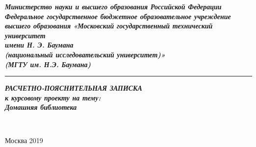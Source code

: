 
\begin{center}
	\hfill \break
	\textit{
		\normalsize {\bf  Министерство науки и высшего образования Российской Федерации}\\
		\normalsize {\bf Федеральное государственное бюджетное образовательное учреждение }\\
		\normalsize {\bf  высшего  образования}
		\normalsize  {\bf  «Московский государственный технический университет}\\ 
		\normalsize  {\bf имени Н. Э. Баумана}\\
		\normalsize  {\bf (национальный исследовательский университет)»}\\
		\normalsize  {\bf (МГТУ им. Н.Э. Баумана)}\\
	}
	\noindent\rule{\textwidth}{2pt}
	\hfill \break
	\hfill\break
	\hfill\break
	\hfill\break
	\hfill\break
	\hfill\break
	\hfill\break
	\hfill \break
	\hfill \break
	\textit{
		\normalsize {\bf РАСЧЕТНО-ПОЯСНИТЕЛЬНАЯ ЗАПИСКА}\\
		\normalsize {\bf к курсовому проекту на тему:}\\
		\normalsize {\bf  Домашняя библиотека} \\
	}
	\hfill \break
	\hfill \break
	\hfill \break
	\hfill \break
	\hfill \break
	\hfill \break
	\hfill \break
	\hfill \break
	\hfill \break
	\hfill \break
	\hfill \break
	
	\hfill \break
	\normalsize {
		\noindent
		\makebox[\textwidth][c]{}%
	}\\
	\hfill \break
	\hfill \break
	\normalsize {
		\noindent
		\makebox[\textwidth][c]{}%
	}
	\hfill \break
	\hfill \break
	\hfill \break
	\hfill \break\hfill \break
	\hfill \break
\end{center}
\hfill \break
\hfill \break
\begin{center} Москва 2019\end{center}

\thispagestyle{empty} 